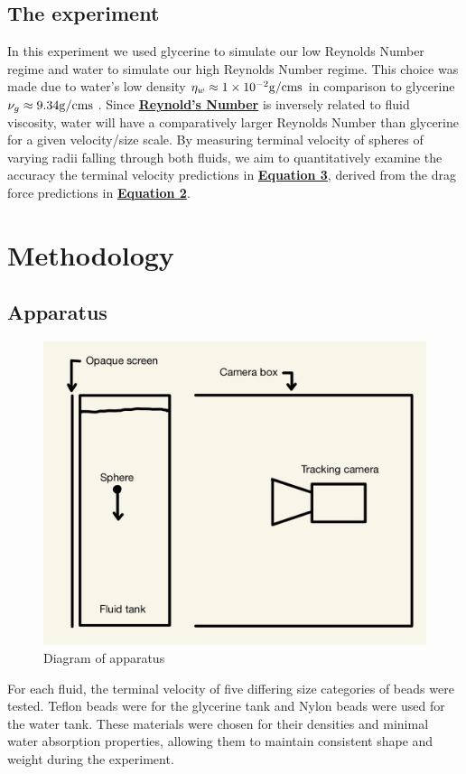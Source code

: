 \documentclass[
	letterpaper
	12pt
]{template}
\newcommand{\bref}[2]{\textbf{\hyperref[#1]{#2}}}
\begin{document}
\subsection{The experiment}
In this experiment we used glycerine to simulate our low Reynolds Number regime and water to simulate our high Reynolds Number regime. This choice was made due to water's low density $\eta_{w} \approx 1\times10^{-2}\unit{g\per {\cm\second}}$ in comparison to glycerine $\nu_g \approx 9.34\unit{g\per {\cm\second}}$ \cite{labManual}. Since \bref{eqn::reynolds}{Reynold's Number} is inversely related to fluid viscosity, water will have a comparatively larger Reynolds Number than  glycerine for a given velocity/size scale. By measuring terminal velocity of spheres of varying radii falling through both fluids, we aim to quantitatively examine the accuracy the terminal velocity predictions in \bref{eqn::terminalVelocity}{Equation 3}, derived from the drag force predictions in \bref{eqn::dragForce}{Equation 2}.


\section{Methodology}
\subsection{Apparatus}
\begin{figure}\label{fig::apparatus}
	\centering
	\vspace{-10pt}
	\includegraphics[width=.35\textwidth]{figures/apparatus.jpg}
	\caption{Diagram of apparatus}
	\vspace{-20pt}
\end{figure}
For each fluid, the terminal velocity of five differing size categories of beads were tested. Teflon beads were for the glycerine tank and Nylon beads were used for the water tank. These materials were chosen for their densities and minimal water absorption properties, allowing them to maintain consistent shape and weight during the experiment.\vspace{\baselineskip}
\end{document}
